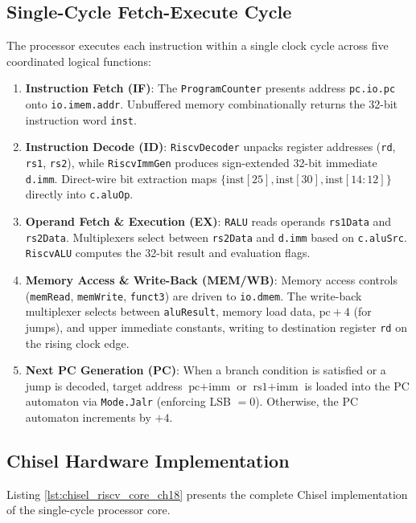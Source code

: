 \subsection{Single-Cycle Fetch-Execute Cycle}

The processor executes each instruction within a single clock cycle across five coordinated logical functions:
\begin{enumerate}
    \item \textbf{Instruction Fetch (IF)}: The \texttt{ProgramCounter} presents address \texttt{pc.io.pc} onto \texttt{io.imem.addr}. Unbuffered memory combinationally returns the 32-bit instruction word \texttt{inst}.
    \item \textbf{Instruction Decode (ID)}: \texttt{RiscvDecoder} unpacks register addresses (\texttt{rd}, \texttt{rs1}, \texttt{rs2}), while \texttt{RiscvImmGen} produces sign-extended 32-bit immediate \texttt{d.imm}. Direct-wire bit extraction maps $\{\text{inst}[25], \text{inst}[30], \text{inst}[14:12]\}$ directly into \texttt{c.aluOp}.
    \item \textbf{Operand Fetch \& Execution (EX)}: \texttt{RALU} reads operands \texttt{rs1Data} and \texttt{rs2Data}. Multiplexers select between \texttt{rs2Data} and \texttt{d.imm} based on \texttt{c.aluSrc}. \texttt{RiscvALU} computes the 32-bit result and evaluation flags.
    \item \textbf{Memory Access \& Write-Back (MEM/WB)}: Memory access controls (\texttt{memRead}, \texttt{memWrite}, \texttt{funct3}) are driven to \texttt{io.dmem}. The write-back multiplexer selects between \texttt{aluResult}, memory load data, $\text{pc} + 4$ (for jumps), and upper immediate constants, writing to destination register \texttt{rd} on the rising clock edge.
    \item \textbf{Next PC Generation (PC)}: When a branch condition is satisfied or a jump is decoded, target address $\text{pc} + \text{imm}$ or $\text{rs1} + \text{imm}$ is loaded into the PC automaton via \texttt{Mode.Jalr} (enforcing LSB $= 0$). Otherwise, the PC automaton increments by $+4$.
\end{enumerate}

\subsection{Chisel Hardware Implementation}

Listing \ref{lst:chisel_riscv_core_ch18} presents the complete Chisel implementation of the single-cycle processor core.


